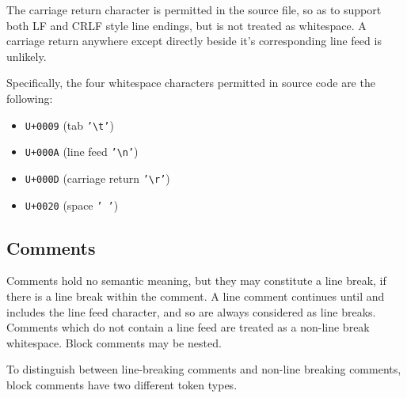 The carriage return character is permitted in the source file, so as to support both
LF and CRLF style line endings, but is not treated as whitespace. A carriage return
anywhere except directly beside it's corresponding line feed is unlikely.

Specifically, the four whitespace characters permitted in \Trilogy{} source code
are the following:

\begin{itemize}
    \item \texttt{U+0009} (tab \texttt{'\textbackslash t'})
    \item \texttt{U+000A} (line feed \texttt{'\textbackslash n'})
    \item \texttt{U+000D} (carriage return \texttt{'\textbackslash r'})
    \item \texttt{U+0020} (space \texttt{' '})
\end{itemize}

\subsection{Comments}

Comments hold no semantic meaning, but they may constitute a line break,
if there is a line break within the comment. A line comment continues until and
includes the line feed character, and so are always considered as line breaks.
Comments which do not contain a line feed are treated as a non-line
break whitespace. Block comments may be nested.

To distinguish between line-breaking comments and non-line breaking comments,
block comments have two different token types.

\begin{bnf*}
     \\
     \\
     \\
     \\
     \\
     \\
     \\
\end{bnf*}

